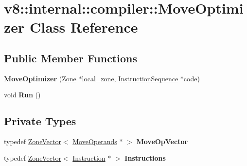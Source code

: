 \hypertarget{classv8_1_1internal_1_1compiler_1_1_move_optimizer}{}\section{v8\+:\+:internal\+:\+:compiler\+:\+:Move\+Optimizer Class Reference}
\label{classv8_1_1internal_1_1compiler_1_1_move_optimizer}
\subsection*{Public Member Functions}
\begin{DoxyCompactItemize}
\item 
{\bfseries Move\+Optimizer} (\hyperlink{classv8_1_1internal_1_1_zone}{Zone} $\ast$local\+\_\+zone, \hyperlink{classv8_1_1internal_1_1compiler_1_1_instruction_sequence}{Instruction\+Sequence} $\ast$code)\hypertarget{classv8_1_1internal_1_1compiler_1_1_move_optimizer_a9d45811f6392ec0da6197335b9dba8aa}{}\label{classv8_1_1internal_1_1compiler_1_1_move_optimizer_a9d45811f6392ec0da6197335b9dba8aa}

\item 
void {\bfseries Run} ()\hypertarget{classv8_1_1internal_1_1compiler_1_1_move_optimizer_a80cb8fa53aed4b4e7af65d13b58cf079}{}\label{classv8_1_1internal_1_1compiler_1_1_move_optimizer_a80cb8fa53aed4b4e7af65d13b58cf079}

\end{DoxyCompactItemize}
\subsection*{Private Types}
\begin{DoxyCompactItemize}
\item 
typedef \hyperlink{classv8_1_1internal_1_1_zone_vector}{Zone\+Vector}$<$ \hyperlink{classv8_1_1internal_1_1compiler_1_1_move_operands}{Move\+Operands} $\ast$ $>$ {\bfseries Move\+Op\+Vector}\hypertarget{classv8_1_1internal_1_1compiler_1_1_move_optimizer_a9e5dfe88147c8ef25688a8fb6204c941}{}\label{classv8_1_1internal_1_1compiler_1_1_move_optimizer_a9e5dfe88147c8ef25688a8fb6204c941}

\item 
typedef \hyperlink{classv8_1_1internal_1_1_zone_vector}{Zone\+Vector}$<$ \hyperlink{classv8_1_1internal_1_1compiler_1_1_instruction}{Instruction} $\ast$ $>$ {\bfseries Instructions}\hypertarget{classv8_1_1internal_1_1compiler_1_1_move_optimizer_ab939b84e05baa0b795e3b57ae8fb8273}{}\label{classv8_1_1internal_1_1compiler_1_1_move_optimizer_ab939b84e05baa0b795e3b57ae8fb8273}

\end{DoxyCompactItemize}
